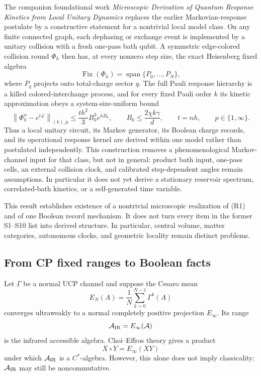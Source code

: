 \documentclass[11pt]{article}
\newcommand{\A}{\mathcal A}
\begin{document}
The companion foundational work \emph{Microscopic Derivation of Quantum
Response Kinetics from Local Unitary Dynamics} replaces the earlier
Markovian-response postulate by a constructive statement for a nontrivial
local model class.  On any finite connected graph,
each dephasing or exchange event is implemented by a unitary collision with a
fresh one-pass bath qubit.  A symmetric edge-colored collision round
\(\Phi_h\) then has, at every nonzero step size, the exact Heisenberg fixed
algebra
\[
 \operatorname{Fix}(\Phi_h)
 =\operatorname{span}\{P_0,\ldots,P_N\},
\]
where \(P_q\) projects onto total-charge sector \(q\).  The full Pauli
response hierarchy is a killed colored-interchange process, and for every
fixed Pauli order \(k\) its kinetic approximation obeys a system-size-uniform
bound
\[
 \left\|\Phi_h^n-e^{t\mathcal L}\right\|_{(k),p}
 \leq \frac{t h^2}{3}B_k^3e^{hB_k},
 \qquad
 B_k\leq \frac{2\chi k\gamma}{d},
 \qquad t=nh,\qquad p\in\{1,\infty\}.
\]
Thus a local unitary circuit, its Markov generator, its Boolean charge
records, and its operational response kernel are derived within one model
rather than postulated independently.  This construction removes a
phenomenological Markov-channel input for that class, but not in general:
product bath
input, one-pass cells, an external collision clock, and calibrated
step-dependent angles remain assumptions.  In particular it does not yet
derive a stationary reservoir spectrum, correlated-bath kinetics, or a
self-generated time variable.

This result establishes existence of a nontrivial microscopic realization of
(R1) and of one Boolean record mechanism.  It does not turn every item in the
former S1--S10 list into derived structure.  In particular, central volume,
matter categories, autonomous clocks, and geometric locality remain distinct
problems.

\subsection{From CP fixed ranges to Boolean facts}

Let $\Gamma$ be a normal UCP channel and suppose the Cesaro mean
\[
E_N(A)=\frac1N\sum_{k=0}^{N-1}\Gamma^k(A)
\]
converges ultraweakly to a normal completely positive projection $E_\infty$.  Its range
\[
\A_{\rm IR}=E_\infty(\A)
\]
is the infrared accessible algebra.  Choi--Effros theory
\cite{ChoiEffros1976,ChoiEffros1977} gives a product
\[
X\circ Y=E_\infty(XY)
\]
under which $\A_{\rm IR}$ is a $C^*$-algebra.  However, this alone does not imply classicality: $\A_{\rm IR}$ may still be noncommutative.
\end{document}
